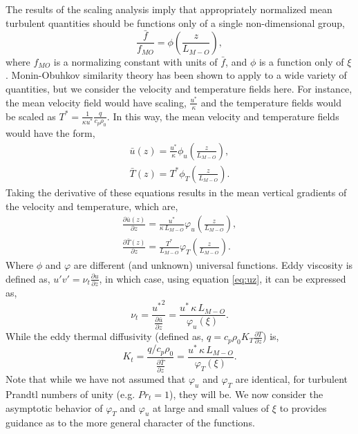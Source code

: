 The results of the scaling analysis imply that appropriately normalized
mean turbulent quantities should be functions only of a single 
non-dimensional group, 
\begin{equation}
 \frac{\bar f}{f_{MO}} = \phi(\frac{z}{L_{M-O}}), 
\end{equation}
where $f_{MO}$ is a normalizing constant with units of $\bar f$, and
$\phi$ is a function only of $\xi$. 
Monin-Obuhkov similarity theory has been shown to apply to a wide variety of
quantities\cite{wyngaard2010turbulence}, but we consider the velocity 
and temperature fields here. For instance, the mean velocity field would
have scaling, $\frac{u^*}{\kappa}$ and the temperature fields would be
scaled as $T^* = \frac{1}{\kappa u^*} \frac{q}{c_p \rho_0}$. In this
way, the mean velocity and temperature fields would have the form,  
\begin{eqnarray}
\bar u(z) = \frac{u^*}{\kappa} \phi_u(\frac{z}{L_{M-O}}), \\
\bar T(z) = T^* \phi_T(\frac{z}{L_{M-O}}).
\end{eqnarray}
Taking the derivative of these equations results in the mean 
vertical gradients of the velocity and temperature, which are,
\begin{eqnarray}
\frac{\partial \bar u(z)}{\partial z} = \frac{u^*}{\kappa \, L_{M-O}}
 \varphi_u(\frac{z}{L_{M-O}}) \label{eq:uz}, \\ 
\frac{\partial \bar T(z)}{\partial z} = \frac{T^*}{L_{M-O}}
 \varphi_T(\frac{z}{L_{M-O}}) \label{eq:tz}.
\end{eqnarray}
Where $\phi$ and $\varphi$ are different (and unknown) universal functions. Eddy
viscosity is defined as, $u'v' = \nu_t \frac{\partial
u}{\partial z}$\cite{durbin2001statistical}, in which case, using
equation \ref{eq:uz}, it can be expressed as, 
\begin{equation}
 \nu_t = \frac{{u^*}^2}{\frac{\partial \bar u}{\partial z}} = \frac{u^* \,
  \kappa \, L_{M-O}}{\varphi_u(\xi)}.
\end{equation}
While the eddy thermal diffusivity (defined as, $q = c_p \rho_0 K_T
\frac{\partial T}{\partial z}$) is,
\begin{equation}
 K_t = \frac{q/c_p \rho_0}{\frac{\partial \bar T}{\partial z}} = \frac{u^* \,
  \kappa \, L_{M-O}}{\varphi_T(\xi)}.
\label{eqn:eddy_kt}
\end{equation}
Note that while we have not assumed that $\varphi_u$ and
$\varphi_T$ are identical, for turbulent Prandtl numbers of unity 
(e.g. $Pr_t = 1$), they will be. We now consider the asymptotic behavior
of $\varphi_T$ and $\varphi_u$ at large and small values of $\xi$
to provides guidance as to the more general character of the functions. 

